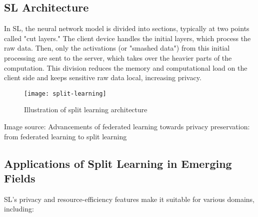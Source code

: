 \subsection{SL Architecture}
\label{sec:sl_architecture}

In \gls{SL}, the neural network model is divided into sections, typically at two points called "cut layers." The client device handles the initial layers, which process the raw data. Then, only the activations (or "smashed data") from this initial processing are sent to the server, which takes over the heavier parts of the computation. This division reduces the memory and computational load on the client side and keeps sensitive raw data local, increasing privacy.


\begin{figure}[H]
  \centering
  \texttt{[image: split-learning]}
  \caption{Illustration of split learning architecture}
  \label{fig:DFL_CFL_DL_LL}
\end{figure}


Image source: Advancements of federated learning towards privacy preservation: from federated learning to split learning

\subsection{Applications of Split Learning in Emerging Fields}
\label{sec:application_of_sl_in_emerging_fields}


SL's privacy and resource-efficiency features make it suitable for various domains, including:

